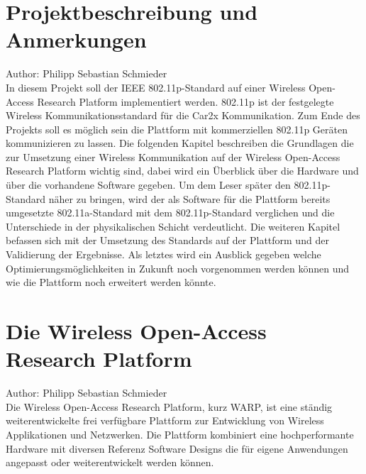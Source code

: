 \documentclass[letterpaper,11pt,ngerman]{article}
\begin{document}
\setcounter{page}{1}
\begin{onehalfspace}
\section{Projektbeschreibung und Anmerkungen}
\small Author: Philipp Sebastian Schmieder\\
\Large
In diesem Projekt soll der IEEE 802.11p-Standard auf einer Wireless Open-Access Research Platform implementiert werden. 802.11p ist der festgelegte Wireless Kommunikationsstandard für die Car2x Kommunikation. Zum Ende des Projekts soll es möglich sein die Plattform mit kommerziellen 802.11p Geräten kommunizieren zu lassen. Die folgenden Kapitel beschreiben die Grundlagen die zur Umsetzung einer Wireless Kommunikation auf der Wireless Open-Access Research Platform wichtig sind, dabei wird ein Überblick über die Hardware und über die vorhandene Software gegeben. Um dem Leser später den 802.11p-Standard näher zu bringen, wird der als Software für die Plattform bereits umgesetzte 802.11a-Standard mit dem 802.11p-Standard verglichen und die Unterschiede in der physikalischen Schicht verdeutlicht. Die weiteren Kapitel befassen sich mit der Umsetzung des Standards auf der Plattform und der Validierung der Ergebnisse. Als letztes wird ein Ausblick gegeben welche Optimierungsmöglichkeiten in Zukunft noch vorgenommen werden können und wie die Plattform noch erweitert werden könnte.
\section{Die Wireless Open-Access Research Platform}
\small Author: Philipp Sebastian Schmieder\\
\Large
Die Wireless Open-Access Research Platform, kurz WARP, ist eine ständig weiterentwickelte frei verfügbare Plattform zur Entwicklung von Wireless Applikationen und Netzwerken.
Die Plattform kombiniert eine hochperformante Hardware mit diversen Referenz Software Designs die für eigene Anwendungen angepasst oder weiterentwickelt werden können.

\end{onehalfspace}
\end{document}
